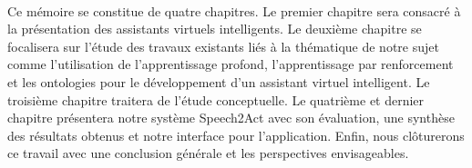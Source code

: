 \paragraph{}
Ce mémoire se constitue de quatre chapitres. Le premier chapitre sera consacré à la présentation des assistants virtuels intelligents. Le deuxième chapitre se focalisera sur l'étude des travaux existants liés à la thématique de notre sujet comme l'utilisation de l'apprentissage profond, l'apprentissage par renforcement et les ontologies pour le développement d'un assistant virtuel intelligent. Le troisième chapitre traitera de l'étude conceptuelle. Le quatrième et dernier chapitre présentera notre système Speech2Act avec son évaluation, une synthèse des résultats obtenus et notre interface pour l'application. Enfin, nous clôturerons ce travail avec une conclusion générale et les perspectives envisageables.

